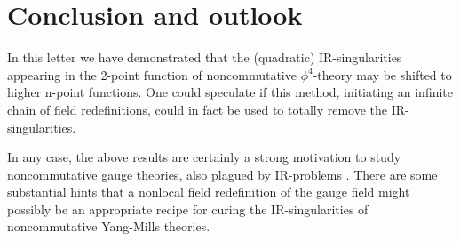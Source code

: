\documentclass[a4paper,12pt]{article}
\begin{document}
\section{Conclusion and outlook}
In this letter we have demonstrated that the (quadratic) IR-singularities appearing in the 2-point function of noncommutative $\phi^4$-theory may be shifted to higher  n-point functions. One could speculate if this method, initiating an infinite chain of field redefinitions, could in fact be used to totally remove the IR-singularities.

In any case, the above results are certainly a strong motivation to study noncommutative gauge theories, also plagued by IR-problems \cite{prep}. There are some substantial hints that a nonlocal field redefinition of the gauge field might possibly be an appropriate recipe for curing the IR-singularities of noncommutative Yang-Mills theories.
\end{document}

